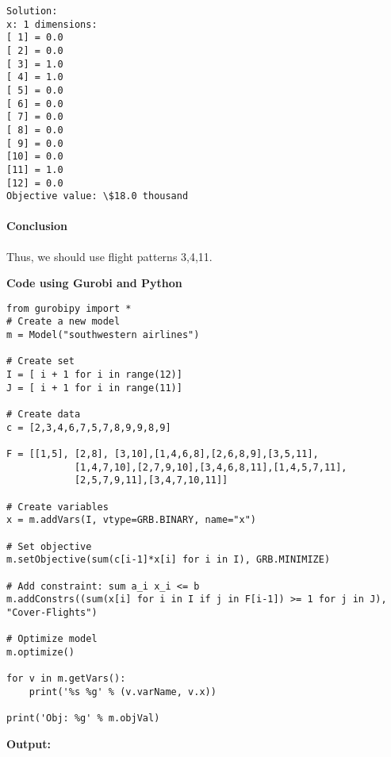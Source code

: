     
    \begin{Verbatim}[commandchars=\\\{\}]
Solution: 
x: 1 dimensions:
[ 1] = 0.0
[ 2] = 0.0
[ 3] = 1.0
[ 4] = 1.0
[ 5] = 0.0
[ 6] = 0.0
[ 7] = 0.0
[ 8] = 0.0
[ 9] = 0.0
[10] = 0.0
[11] = 1.0
[12] = 0.0
Objective value: \$18.0 thousand

    \end{Verbatim}

    \hypertarget{conclusion}{%
\paragraph{Conclusion}\label{conclusion}}

Thus, we should use flight patterns 3,4,11.


\textbf{Code using Gurobi and Python}
\begin{verbatim}
from gurobipy import *
# Create a new model
m = Model("southwestern airlines")

# Create set
I = [ i + 1 for i in range(12)]
J = [ i + 1 for i in range(11)]

# Create data
c = [2,3,4,6,7,5,7,8,9,9,8,9]

F = [[1,5], [2,8], [3,10],[1,4,6,8],[2,6,8,9],[3,5,11],
            [1,4,7,10],[2,7,9,10],[3,4,6,8,11],[1,4,5,7,11],
            [2,5,7,9,11],[3,4,7,10,11]]

# Create variables
x = m.addVars(I, vtype=GRB.BINARY, name="x")

# Set objective
m.setObjective(sum(c[i-1]*x[i] for i in I), GRB.MINIMIZE)

# Add constraint: sum a_i x_i <= b
m.addConstrs((sum(x[i] for i in I if j in F[i-1]) >= 1 for j in J), "Cover-Flights")

# Optimize model
m.optimize()

for v in m.getVars():
    print('%s %g' % (v.varName, v.x))

print('Obj: %g' % m.objVal)
\end{verbatim}

\textbf{Output:}

